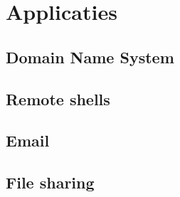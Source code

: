 \section{Applicaties}



\subsection{Domain Name System}
\label{sec:dns}


\subsection{Remote shells}

\begin{frame}
\end{frame}



\subsection{Email}

\begin{frame}
\end{frame}


\subsection{File sharing}


\begin{frame}
\end{frame}


